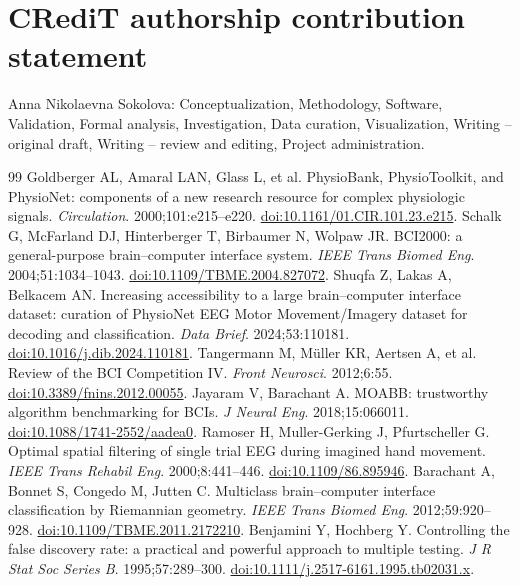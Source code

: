 \documentclass[11pt]{article}
\begin{document}
\section*{CRediT authorship contribution statement}
Anna Nikolaevna Sokolova: Conceptualization, Methodology, Software, Validation, Formal analysis, Investigation, Data curation, Visualization, Writing -- original draft, Writing -- review and editing, Project administration.

\FloatBarrier
\begin{thebibliography}{99}
 Goldberger AL, Amaral LAN, Glass L, et al. PhysioBank, PhysioToolkit, and PhysioNet: components of a new research resource for complex physiologic signals. \textit{Circulation}. 2000;101:e215--e220. \href{https://doi.org/10.1161/01.CIR.101.23.e215}{doi:10.1161/01.CIR.101.23.e215}.
 Schalk G, McFarland DJ, Hinterberger T, Birbaumer N, Wolpaw JR. BCI2000: a general-purpose brain--computer interface system. \textit{IEEE Trans Biomed Eng}. 2004;51:1034--1043. \href{https://doi.org/10.1109/TBME.2004.827072}{doi:10.1109/TBME.2004.827072}.
 Shuqfa Z, Lakas A, Belkacem AN. Increasing accessibility to a large brain--computer interface dataset: curation of PhysioNet EEG Motor Movement/Imagery dataset for decoding and classification. \textit{Data Brief}. 2024;53:110181. \href{https://doi.org/10.1016/j.dib.2024.110181}{doi:10.1016/j.dib.2024.110181}.
 Tangermann M, M\"uller KR, Aertsen A, et al. Review of the BCI Competition IV. \textit{Front Neurosci}. 2012;6:55. \href{https://doi.org/10.3389/fnins.2012.00055}{doi:10.3389/fnins.2012.00055}.
 Jayaram V, Barachant A. MOABB: trustworthy algorithm benchmarking for BCIs. \textit{J Neural Eng}. 2018;15:066011. \href{https://doi.org/10.1088/1741-2552/aadea0}{doi:10.1088/1741-2552/aadea0}.
 Ramoser H, Muller-Gerking J, Pfurtscheller G. Optimal spatial filtering of single trial EEG during imagined hand movement. \textit{IEEE Trans Rehabil Eng}. 2000;8:441--446. \href{https://doi.org/10.1109/86.895946}{doi:10.1109/86.895946}.
 Barachant A, Bonnet S, Congedo M, Jutten C. Multiclass brain--computer interface classification by Riemannian geometry. \textit{IEEE Trans Biomed Eng}. 2012;59:920--928. \href{https://doi.org/10.1109/TBME.2011.2172210}{doi:10.1109/TBME.2011.2172210}.
 Benjamini Y, Hochberg Y. Controlling the false discovery rate: a practical and powerful approach to multiple testing. \textit{J R Stat Soc Series B}. 1995;57:289--300. \href{https://doi.org/10.1111/j.2517-6161.1995.tb02031.x}{doi:10.1111/j.2517-6161.1995.tb02031.x}.
\end{thebibliography}
\end{document}
